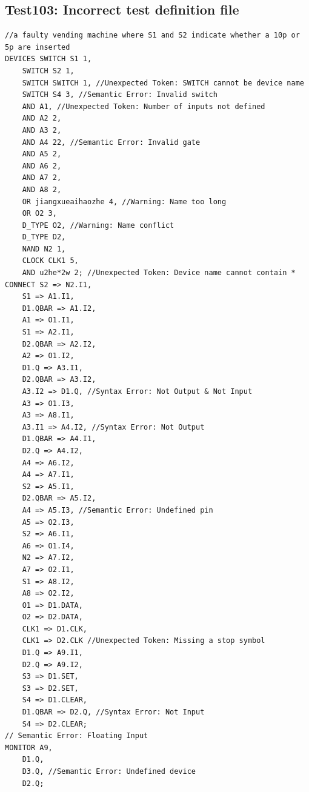 \documentclass[12pt]{article}
\begin{document}
\subsection{Test103: Incorrect test definition file}
\begin{verbatim}
//a faulty vending machine where S1 and S2 indicate whether a 10p or 5p are inserted
DEVICES	SWITCH S1 1, 
	SWITCH S2 1,
	SWITCH SWITCH 1, //Unexpected Token: SWITCH cannot be device name
	SWITCH S4 3, //Semantic Error: Invalid switch
	AND A1, //Unexpected Token: Number of inputs not defined
	AND A2 2,
	AND A3 2,
	AND A4 22, //Semantic Error: Invalid gate
	AND A5 2,
	AND A6 2,
	AND A7 2,
	AND A8 2,
	OR jiangxueaihaozhe 4, //Warning: Name too long
	OR O2 3,
	D_TYPE O2, //Warning: Name conflict
	D_TYPE D2,
	NAND N2 1,
	CLOCK CLK1 5,
	AND u2he*2w 2; //Unexpected Token: Device name cannot contain *
CONNECT	S2 => N2.I1,
	S1 => A1.I1,
	D1.QBAR => A1.I2,
	A1 => O1.I1,
	S1 => A2.I1,
	D2.QBAR => A2.I2,
	A2 => O1.I2,
	D1.Q => A3.I1,
	D2.QBAR => A3.I2,
	A3.I2 => D1.Q, //Syntax Error: Not Output & Not Input
	A3 => O1.I3,
	A3 => A8.I1,
	A3.I1 => A4.I2, //Syntax Error: Not Output
	D1.QBAR => A4.I1,
	D2.Q => A4.I2,
	A4 => A6.I2,
	A4 => A7.I1,
	S2 => A5.I1,
	D2.QBAR => A5.I2,
	A4 => A5.I3, //Semantic Error: Undefined pin
	A5 => O2.I3,
	S2 => A6.I1,
	A6 => O1.I4,
	N2 => A7.I2,
	A7 => O2.I1,
	S1 => A8.I2,
	A8 => O2.I2,
	O1 => D1.DATA,
	O2 => D2.DATA,
	CLK1 => D1.CLK,
	CLK1 => D2.CLK //Unexpected Token: Missing a stop symbol
	D1.Q => A9.I1,
	D2.Q => A9.I2,
	S3 => D1.SET,
	S3 => D2.SET,
	S4 => D1.CLEAR,
	D1.QBAR => D2.Q, //Syntax Error: Not Input
	S4 => D2.CLEAR;
// Semantic Error: Floating Input
MONITOR	A9,
	D1.Q,
	D3.Q, //Semantic Error: Undefined device
	D2.Q;
\end{verbatim}
\end{document}
